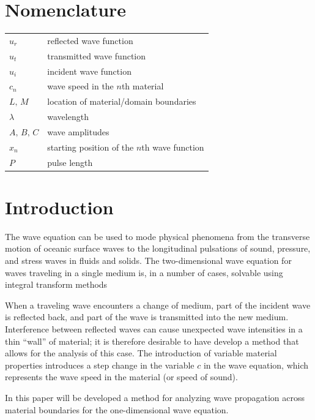 \documentclass[twocolumn, letterpaper]{article}
\begin{document}
\section*{Nomenclature}
{\renewcommand\arraystretch{1.0}
\noindent\begin{supertabular}{@{}l @{\quad=\quad} l@{}}
$u_r$  &  reflected wave function\\
$u_t$ & transmitted wave function\\
$u_i$ & incident wave function \\
$c_n$ & wave speed in the $n$th material \\
$L\text{, }M$ & location of material/domain boundaries\\ %
$\lambda$ & wavelength\\
$A\text{, }B\text{, } C$ & wave amplitudes\\
$x_n$ & starting position of the $n$th wave function\\
$P$ & pulse length\\





\end{supertabular}}


\section*{Introduction}

The wave equation can be used to mode physical phenomena from the transverse motion of oceanic surface waves to the longitudinal pulsations of sound, pressure, and stress waves in fluids and solids. The two-dimensional wave equation for waves traveling in a single medium is, in a number of cases, solvable using integral transform methods \cite{badger-2020,dickerson-2020,lee-2021,wilson-2020,}

When a traveling  wave encounters a change of medium, part of the incident wave is reflected back, and part of the wave is transmitted into the new medium. Interference between reflected waves can cause unexpected wave intensities in a thin ``wall'' of material; it is therefore desirable to have develop a method that allows for the analysis of this case. The introduction of variable material properties introduces a step change in the variable $c$ in the wave equation, which represents the wave speed in the material (or speed of sound). 

In this paper will be developed a method for analyzing wave propagation across material boundaries for the one-dimensional wave equation.
\end{document}

